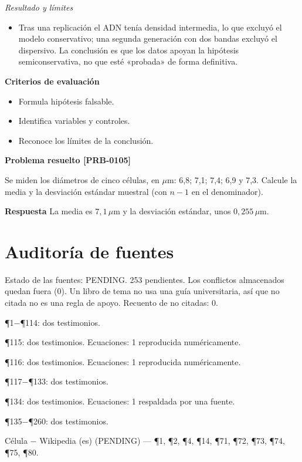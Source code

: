 \documentclass{book}
\begin{document}
\noindent\textit{Resultado y límites}
\begin{itemize}
\item Tras una replicación el ADN tenía densidad intermedia, lo que excluyó el modelo conservativo; una segunda generación con dos bandas excluyó el dispersivo. La conclusión es que los datos apoyan la hipótesis semiconservativa, no que esté «probada» de forma definitiva.
\end{itemize}

\noindent\textbf{Criterios de evaluación}
\begin{itemize}
\item Formula hipótesis falsable.
\item Identifica variables y controles.
\item Reconoce los límites de la conclusión.
\end{itemize}

\noindent\textbf{Problema resuelto [PRB-0105]}

Se miden los diámetros de cinco células, en \(\mu\mathrm{m}\): 6,8; 7,1; 7,4; 6,9 y 7,3. Calcule la media y la desviación estándar muestral (con \(n - 1\) en el denominador).


\noindent\textbf{Respuesta}
La media es \(7{,}1\,\mu\mathrm{m}\) y la desviación estándar, unos \(0{,}255\,\mu\mathrm{m}\).

\chapter{Auditoría de fuentes}

\noindent Estado de las fuentes: PENDING. 253 pendientes. Los conflictos almacenados quedan fuera (0). Un libro de tema no usa una guía universitaria, así que no citada no es una regla de apoyo. Recuento de no citadas: 0.

\noindent ¶1\(-\)¶114: dos testimonios.

\noindent ¶115: dos testimonios. Ecuaciones: 1 reproducida numéricamente.

\noindent ¶116: dos testimonios. Ecuaciones: 1 reproducida numéricamente.

\noindent ¶117\(-\)¶133: dos testimonios.

\noindent ¶134: dos testimonios. Ecuaciones: 1 respaldada por una fuente.

\noindent ¶135\(-\)¶260: dos testimonios.

\medskip

\noindent Célula \(-\) Wikipedia (es) (PENDING) --- \P1, \P2, \P4, \P14, \P71, \P72, \P73, \P74, \P75, \P80.
\end{document}
